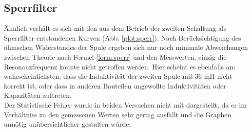 \subsection{Sperrfilter}
Ähnlich verhält es sich mit den aus dem Betrieb der zweiten Schaltung als Sperrfilter entstandenen Kurven (Abb. \ref{plot:sperr}). Nach Berücksichtigung des ohmschen Widerstandes der Spule ergeben sich nur noch minimale Abweichungen zwischen Theorie nach Formel \eqref{form:sperr} und den Messwerten, einzig die Resonanzfrequenz konnte nicht getroffen werden. Hier scheint es ebenfalls am wahrscheinlichsten, dass die Induktivität der zweiten Spule mit 36 mH nicht korrekt ist, oder dass in anderen Bauteilen ungewollte Induktivitäten oder Kapazitäten auftreten.
\\
Der Statistische Fehler wurde in beiden Versuchen nicht mit dargestellt, da er im Verhältniss zu den gemessenen Werten sehr gering ausfällt und die Graphen unnötig unübersichtlicher gestalten würde.

